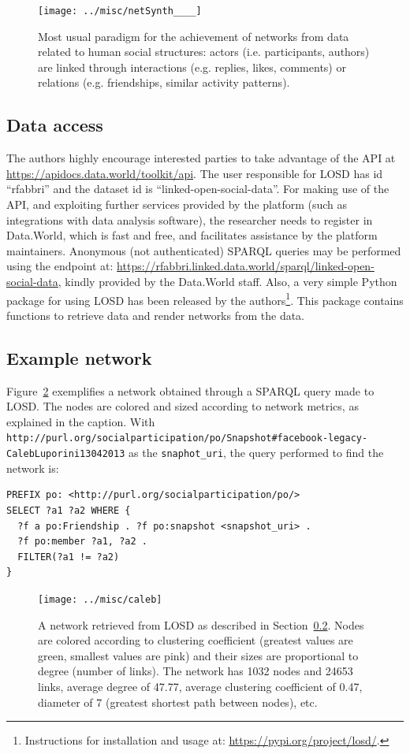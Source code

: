 \documentclass[data,datadescriptor,submit,moreauthors,pdftex]{Definitions/mdpi}
\newcommand{\te}[1] {\texttt{\footnotesize#1}}
\begin{document}
\begin{figure}[H]
    \centering
    \texttt{[image: ../misc/netSynth\_\_\_\_]}
    \caption{Most usual paradigm for the achievement of networks from data related to human social structures:
    actors (i.e. participants, authors) are linked through interactions
    (e.g. replies, likes, comments)
    or relations (e.g. friendships, similar activity patterns).}\label{fnet}
\end{figure}

\subsection{Data access}\label{sac}
The authors highly encourage interested parties to take advantage of the API at \url{https://apidocs.data.world/toolkit/api}.
The user responsible for LOSD has id ``rfabbri'' and the dataset id is ``linked-open-social-data''.
For making use of the API, and exploiting further services provided by the platform (such as integrations with data analysis software), the researcher needs to register in Data.World, which is fast and free, and facilitates assistance by the platform maintainers.
Anonymous (not authenticated) SPARQL queries may be performed using the endpoint at: \url{https://rfabbri.linked.data.world/sparql/linked-open-social-data}, kindly provided by the Data.World staff.
Also, a very simple Python package for using LOSD has been released by the authors\footnote{Instructions for installation and usage at: \url{https://pypi.org/project/losd/}.}.
This package contains functions to retrieve data and render networks from the data.


\subsection{Example network}\label{sex}
Figure~\ref{caleb} exemplifies a network obtained through a SPARQL query made to LOSD. The nodes are colored and sized according to network metrics, as explained in the caption. With \te{http://purl.org/socialparticipation/po/Snapshot\#facebook-legacy-CalebLuporini13042013} as the \te{snaphot\_uri}, the query performed to find the network is:
\begin{lstlisting}[language=spq]
PREFIX po: <http://purl.org/socialparticipation/po/>
SELECT ?a1 ?a2 WHERE {
  ?f a po:Friendship . ?f po:snapshot <snapshot_uri> .
  ?f po:member ?a1, ?a2 .
  FILTER(?a1 != ?a2)
}
\end{lstlisting}

\begin{figure}[H]
    \centering
    \texttt{[image: ../misc/caleb]}
    \caption{
      A network retrieved from LOSD as described in Section~\ref{sex}.
  Nodes are colored according to clustering coefficient (greatest values are green, smallest values are pink) and their sizes are proportional to degree (number of links). The network has 1032 nodes and 24653 links, average degree of 47.77, average clustering coefficient of 0.47, diameter of 7 (greatest shortest path between nodes), etc.
    }\label{caleb}
\end{figure}
\end{document}
